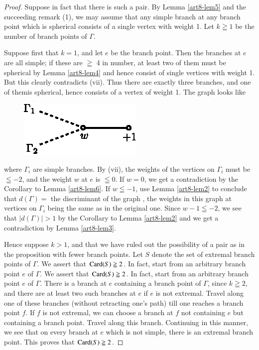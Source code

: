 \begin{proof}
Suppose in fact that there is such a pair. By Lemma \ref{art8-lem5} and the succeeding remark (1), we may assume that any simple branch at any branch point which is spherical consists of a single vertex with weight 1. Let $k \geqq 1$ be the number of branch points of $\Gamma$.

Suppose first that $k=1$, and let $e$ be the branch point. Then the branches at $e$ are all simple; if these are $\geqq$ 4 in number, at least two of them must be spherical by Lemma \ref{art8-lem4} and hence consist of single vertices with weight 1. But this clearly contradicts (vii). Thus there are exactly three branches, and one of them\pageoriginale is spherical, hence consists of a vertex of weight 1. The graph looks like
\begin{figure}[H]
\centering
\includegraphics{fig11.eps}
\end{figure}
\noindent
where  $\Gamma_i$ are simple branches. By (vii), the weights of the vertices on $\Gamma_i$ must be $\leqq -2$, and the weight $w$ at $e$ is $\leqq 0$. If $w=0$, we get a contradiction by the Corollary to Lemma \ref{art8-lem6}. If $w \leqq -1$, use Lemma \ref{art8-lem2} to conclude that $d(\Gamma) =$ the discriminant of the graph , the weights in this graph at vertices on $\Gamma_i$ being the same as in the original one. Since $w -1 \leqq -2$, we see that $|d(\Gamma)|>1$ by the Corollary to Lemma \ref{art8-lem2} and we get a contradiction by Lemma \ref{art8-lem3}.

Hence suppose $k>1$, and that we have ruled out the possibility of a pair as in the proposition with fewer branch points. Let $S$ denote the set of extremal branch points of $\Gamma$. We assert that $\operatorname{Card} (S) \geqq 2$. In fact, start from an arbitrary branch point $e$ of $\Gamma$. We assert that $\operatorname{Card} (S) \geqq 2$. In fact, start from an arbitrary branch point $e$ of $\Gamma$. There is a branch at $e$ containing a branch point of $\Gamma$, since $k  \geqq 2$, and there are at least two such branches at $e$ if $e$ is not extremal. Travel along one of these branches (without retracting one's path) till one reaches a branch point $f$. If $f$ is not extremal, we can choose a branch at $f$ not containing $e$ but containing a branch point. Travel along this branch. Continuing in this manner, we see that on every branch at $e$ which is not simple, there is an extremal branch point. This proves that $\operatorname{Card} (S) \geqq 2$.


\end{proof}
